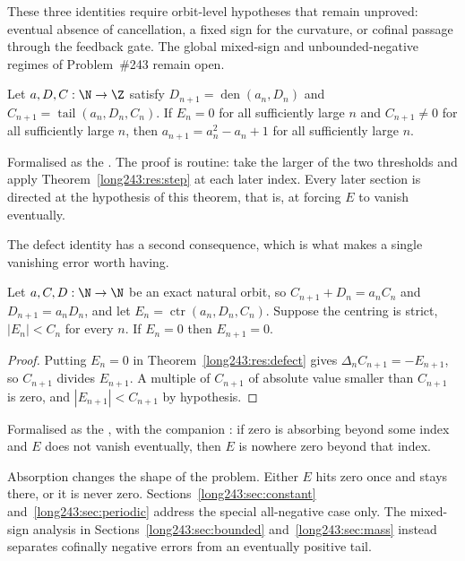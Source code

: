 \documentclass[11pt]{article}
\newcommand{\den}{\operatorname{den}}
\newcommand{\tail}{\operatorname{tail}}
\newcommand{\ctr}{\operatorname{ctr}}
\begin{document}
These three identities require orbit-level hypotheses that remain unproved:
eventual absence of cancellation, a fixed sign for the curvature, or cofinal
passage through the feedback gate.  The global mixed-sign and
unbounded-negative regimes of Problem~\#243 remain open.

\begin{theorem}\label{long243:res:eventual}
Let $a,D,C:\N\to\Z$ satisfy $D_{n+1}=\den(a_n,D_n)$ and
$C_{n+1}=\tail(a_n,D_n,C_n)$.  If $E_n=0$ for all sufficiently large $n$ and
$C_{n+1}\ne0$ for all sufficiently large $n$, then $a_{n+1}=a_n^{2}-a_n+1$ for
all sufficiently large $n$.
\end{theorem}

\noindent Formalised as the
.  The proof is routine: take the larger of the two
thresholds and apply Theorem~\ref{long243:res:step} at each later index.  Every later
section is directed at the hypothesis of this theorem, that is, at forcing $E$
to vanish eventually.

The defect identity has a second consequence, which is what makes a single
vanishing error worth having.

\begin{theorem}\label{long243:res:absorb}
Let $a,C,D:\N\to\N$ be an exact natural orbit, so
$C_{n+1}+D_n=a_nC_n$ and $D_{n+1}=a_nD_n$, and let
$E_n=\ctr(a_n,D_n,C_n)$.  Suppose the centring is strict, $|E_n|<C_n$ for
every $n$.  If $E_n=0$ then $E_{n+1}=0$.
\end{theorem}

\begin{proof}
Putting $E_n=0$ in Theorem~\ref{long243:res:defect} gives
$\Delta_n C_{n+1}=-E_{n+1}$, so $C_{n+1}$ divides $E_{n+1}$.  A multiple of
$C_{n+1}$ of absolute value smaller than $C_{n+1}$ is zero, and
$|E_{n+1}|<C_{n+1}$ by hypothesis.
\end{proof}

\noindent Formalised as the
, with the companion
: if zero is absorbing beyond some index and $E$ does not vanish
eventually, then $E$ is nowhere zero beyond that index.

Absorption changes the shape of the problem.  Either $E$ hits zero once and
stays there, or it is never zero.  Sections~\ref{long243:sec:constant}
and~\ref{long243:sec:periodic} address the special all-negative case only.  The
mixed-sign analysis
in Sections~\ref{long243:sec:bounded} and~\ref{long243:sec:mass} instead separates cofinally
negative errors from an eventually positive tail.
\end{document}
